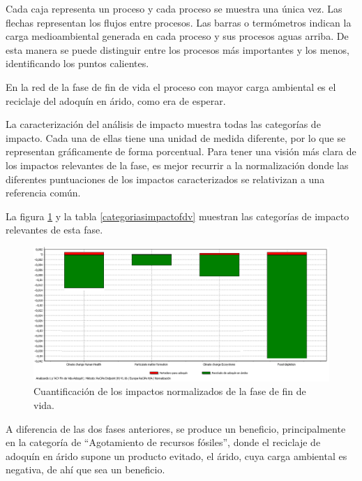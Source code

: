 Cada caja representa un proceso y cada proceso se muestra una única vez. Las flechas representan los flujos entre procesos. Las barras o termómetros indican la carga medioambiental generada en cada proceso y sus procesos aguas arriba. De esta manera se puede distinguir entre los procesos más importantes y los menos, identificando los puntos calientes.

En la red de la fase de fin de vida el proceso con mayor carga ambiental es el reciclaje del adoquín en árido, como era de esperar.

La caracterización del análisis de impacto muestra todas las categorías de impacto. Cada una de ellas tiene una unidad de medida diferente, por lo que se representan gráficamente de forma porcentual. Para tener una visión más clara de los impactos relevantes de la fase, es mejor recurrir a la normalización donde las diferentes puntuaciones de los impactos caracterizados se relativizan a una referencia común.

La figura \ref{fig:fdv_normalizacion} y la tabla \ref{categoriasimpactofdv} muestran las categorías de impacto relevantes de esta fase.

\begin{figure}[!htb]
\centering
\includegraphics[width=15cm]{img/fdv_normalizacion.png}
\caption{Cuantificación de los impactos normalizados de la fase de fin de vida.}
\label{fig:fdv_normalizacion}
\end{figure}

A diferencia de las dos fases anteriores, se produce un beneficio, principalmente en la categoría de ``Agotamiento de recursos fósiles'', donde el reciclaje de adoquín en árido supone un producto evitado, el árido, cuya carga ambiental es negativa, de ahí que sea un beneficio.

